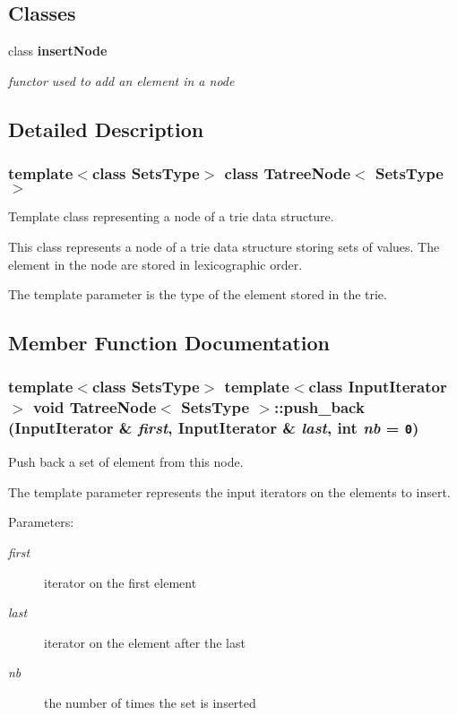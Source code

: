 \subsection*{Classes}
\begin{CompactItemize}
\item 
class {\bf insert\-Node}
\begin{CompactList}\small\item\em functor used to add an element in a node \item\end{CompactList}\end{CompactItemize}


\subsection{Detailed Description}
\subsubsection*{template$<$class Sets\-Type$>$ class Tatree\-Node$<$ Sets\-Type $>$}

Template class representing a node of a trie data structure. 

This class represents a node of a trie data structure storing sets of values. The element in the node are stored in lexicographic order.

The template parameter is the type of the element stored in the trie. 



\subsection{Member Function Documentation}
\subsubsection{\setlength{\rightskip}{0pt plus 5cm}template$<$class Sets\-Type$>$ template$<$class Input\-Iterator$>$ void {\bf Tatree\-Node}$<$ Sets\-Type $>$::push\_\-back (Input\-Iterator \& {\em first}, Input\-Iterator \& {\em last}, int {\em nb} = {\tt 0})\hspace{0.3cm}{\tt  [inline]}}\label{class_tatree_node_b54221d3b995b8d20098f0e7325e1f79}


Push back a set of element from this node. 

The template parameter represents the input iterators on the elements to insert. \begin{Desc}
\item[Parameters:]
\begin{description}
\item[{\em first}]iterator on the first element \item[{\em last}]iterator on the element after the last \item[{\em nb}]the number of times the set is inserted \end{description}
\end{Desc}
